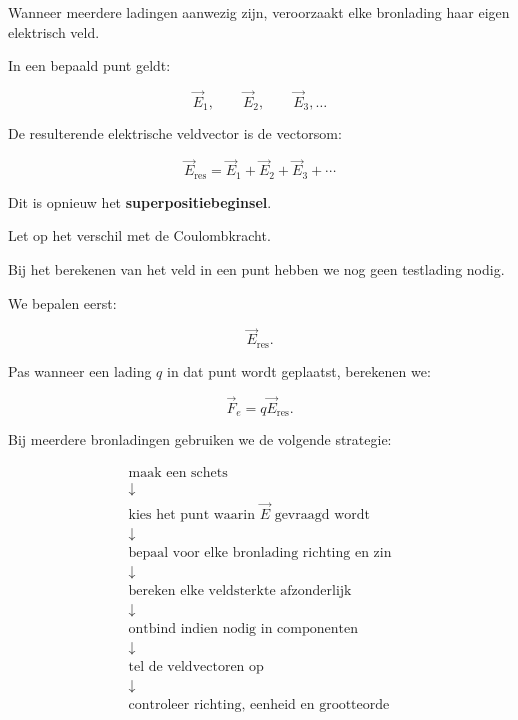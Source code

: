 \documentclass{ximera}
\begin{document}


Wanneer meerdere ladingen aanwezig zijn, veroorzaakt elke bronlading
haar eigen elektrisch veld.

In een bepaald punt geldt:

\[
\vec E_1,
\qquad
\vec E_2,
\qquad
\vec E_3,
\ldots
\]

De resulterende elektrische veldvector is de vectorsom:

\[
\boxed{
\vec E_\mathrm{res}
=
\vec E_1+\vec E_2+\vec E_3+\cdots
}
\]

Dit is opnieuw het \textbf{superpositiebeginsel}.


Let op het verschil met de Coulombkracht.

Bij het berekenen van het veld in een punt hebben we nog geen
testlading nodig.

We bepalen eerst:

\[
\vec E_\mathrm{res}.
\]

Pas wanneer een lading $q$ in dat punt wordt geplaatst, berekenen we:

\[
\vec F_e=q\vec E_\mathrm{res}.
\]




Bij meerdere bronladingen gebruiken we de volgende strategie:

\[
\boxed{
\begin{array}{c}
\text{maak een schets}
\\
\downarrow
\\
\text{kies het punt waarin }\vec E\text{ gevraagd wordt}
\\
\downarrow
\\
\text{bepaal voor elke bronlading richting en zin}
\\
\downarrow
\\
\text{bereken elke veldsterkte afzonderlijk}
\\
\downarrow
\\
\text{ontbind indien nodig in componenten}
\\
\downarrow
\\
\text{tel de veldvectoren op}
\\
\downarrow
\\
\text{controleer richting, eenheid en grootteorde}
\end{array}
}
\]
\end{document}
